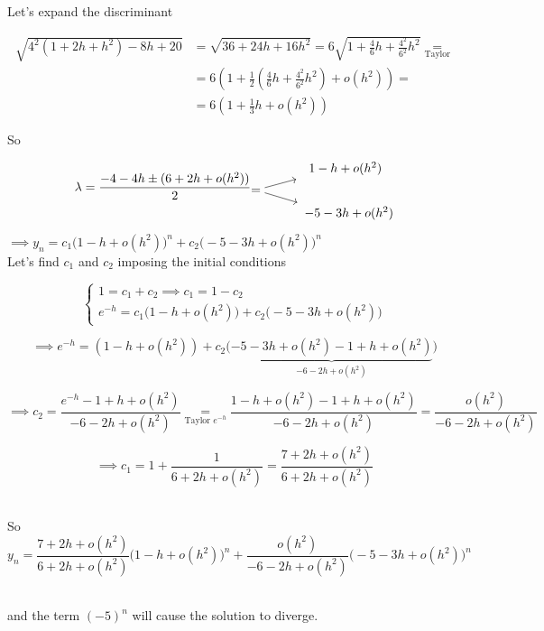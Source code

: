 \begin{example}
    Let's expand the discriminant
    
    \begin{align*}
        \sqrt{4^2(1 + 2h + h^2) - 8h + 20} &= \sqrt{36 + 24h +16h^2} = 6\sqrt{1+\frac{4}{6}h + \frac{4^2}{6^2}h^2} \underset{\text{Taylor}}{=}\\
        &=6\left(1 + \frac{1}{2}\left(\frac{4}{6}h + \frac{4^2}{6^2}h^2\right) + o(h^2)\right) =\\
        &=6\left(1 + \frac{1}{3}h + o(h^2)\right)
    \end{align*}
      
    So
    
    $$
        \lambda = \frac{-4 - 4h \pm (6 + 2h + o(h^2))}{2}
          \begin{tikzcd}[cramped, sep=tiny]
                                    & \hspace{0.6cm}1-h+o(h^2) \\
            = \arrow[ur] \arrow[dr] &            \\
                                    & \hspace{0.8cm}-5-3h + o(h^2)
          \end{tikzcd}
    $$
    
    $\implies y_n = c_1\big(1-h+o(h^2)\big)^n + c_2\big(-5-3h+o(h^2)\big)^n$\\
    
    \newpage
    Let's find $c_1$ and $c_2$ imposing the initial conditions
    
    \[
    \begin{cases}
        1=c_1+c_2 \implies c_1 = 1-c_2 \\
        e^{-h} = c_1\big(1-h+o(h^2)\big) + c_2\big(-5-3h+o(h^2)\big)
    \end{cases}
    \]
    
    \[
       \implies e^{-h} = (1-h+o(h^2)) + c_2\big(\underbrace{-5-3h+o(h^2) - 1 + h + o(h^2)}_{-6-2h+o(h^2)}\big)
    \]
    
    \[
      \implies c_2 = \frac{e^{-h} - 1 + h +o(h^2)}{-6-2h+o(h^2)} \underset{\text{Taylor }e^{-h}}{=} \frac{1-h+o(h^2) - 1 + h +o(h^2)}{-6-2h+o(h^2)} = \frac{o(h^2)}{-6-2h + o(h^2)}
    \]
    
    \[
      \implies c_1 = 1 + \frac{1}{6+2h+o(h^2)} = \frac{7+2h+o(h^2)}{6+2h+o(h^2)}
    \]
    
    \-\\So $$y_n = \frac{7+2h+o(h^2)}{6+2h+o(h^2)}\big(1-h+o(h^2)\big)^n + \frac{o(h^2)}{-6-2h + o(h^2)}\big(-5-3h+o(h^2)\big)^n$$
    
    \-\\and the term $(-5)^n$ will cause the solution to diverge.
\end{example}